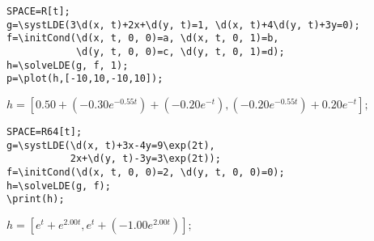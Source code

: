 \begin{verbatim}
SPACE=R[t];
g=\systLDE(3\d(x, t)+2x+\d(y, t)=1, \d(x, t)+4\d(y, t)+3y=0);
f=\initCond(\d(x, t, 0, 0)=a, \d(x, t, 0, 1)=b, 
            \d(y, t, 0, 0)=c, \d(y, t, 0, 1)=d);
h=\solveLDE(g, f, 1); 
p=\plot(h,[-10,10,-10,10]); 
\end{verbatim}

{$h = [0. 50+(-0. 30 e^{-0. 55t})+(-0. 20 e^{-t}), (-0. 20 e^{-0. 55t})+0. 20 e^{-t}];$}

\begin{verbatim}
SPACE=R64[t];
g=\systLDE(\d(x, t)+3x-4y=9\exp(2t), 
           2x+\d(y, t)-3y=3\exp(2t));
f=\initCond(\d(x, t, 0, 0)=2, \d(y, t, 0, 0)=0);
h=\solveLDE(g, f); 
\print(h);
\end{verbatim}

{$h = [e^{t}+e^{2. 00t}, e^{t}+(-1. 00 e^{2. 00t})];$}

